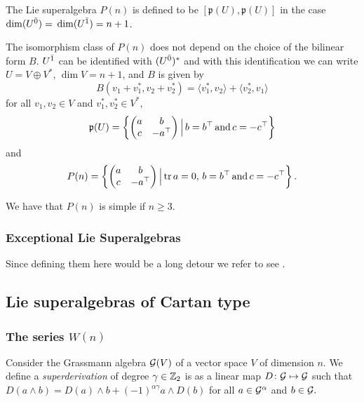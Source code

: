 The Lie superalgebra $P(n)$ is defined to be $[\mathfrak{p}(U),\mathfrak{p}(U)]$ in the case \\ $\dim (U^{\bar0}) =$ $\operatorname{dim} (U^{\bar1}) = n+1$.

The isomorphism class of $P(n)$ does not depend on the choice of the bilinear form $B$. %
$U^{\bar1}$ can be identified with $(U^{\bar0})^*$ and with this identification we can write $U=V\oplus V^*$, $\operatorname{dim} V = n+1$, and $B$ is given by
\[B(v_1+v^*_1,v_2 + v_2^*) = \langle v_1^*, v_2\rangle + \langle v_2^*, v_1\rangle\] for all $v_1, v_2\in V$ and $v_1^*, v_2^*\in V^*$,%
%
%
\[\mathfrak{p}(U) = \left\{\left(\begin{matrix}
			a & b         \\
			c & -a^{\top} \\
		\end{matrix}
	\right) \Big| \, b=b^{\top} \,\text{and}\, c=-c^{\top}\right\}\]
% 
and
% 
\[P(n) = \left\{\left(\begin{matrix}
			a & b         \\
			c & -a^{\top} \\
		\end{matrix}
	\right)\Big| \operatorname{tr} a = 0,\, b=b^{\top} \,\text{and}\, c=-c^{\top}\right\}.\]

We have that $P(n)$ is simple if $n\geq 3$.

\subsubsection{Exceptional Lie Superalgebras} Since defining them here would be a long detour we refer to see \cite{artigokac}.

\subsection{Lie superalgebras of Cartan type}

\subsubsection{The series $W(n)$}
Consider the Grassmann algebra $\mathcal G(V)$ of a vector space $V$ of dimension $n$. We define a \emph{superderivation} of degree $\gamma\in\mathbb{Z}_{2}$ is as a linear map $D\colon \mathcal G \mapsto \mathcal G$ such that $D (a\wedge b)= D (a)\wedge b + (-1)^{\alpha\gamma} a\wedge D (b)$ for all $a \in \mathcal G^{\alpha}$ and $b\in \mathcal G.$


